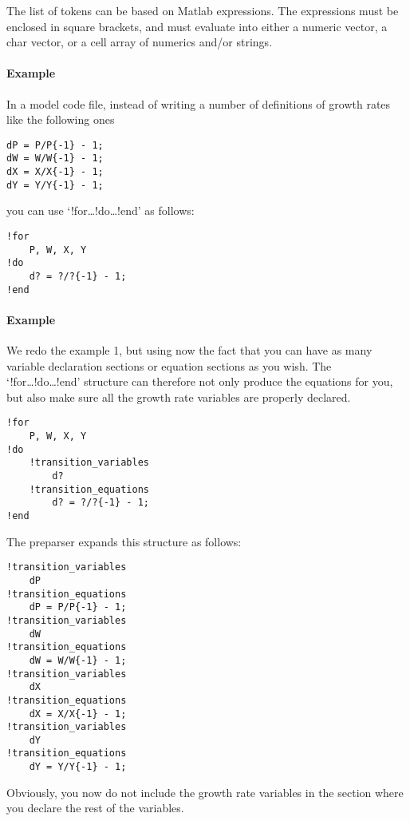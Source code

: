 The list of tokens can be based on Matlab expressions. The expressions
must be enclosed in square brackets, and must evaluate into either a
numeric vector, a char vector, or a cell array of numerics and/or
strings.

\paragraph{Example}

In a model code file, instead of writing a number of definitions of
growth rates like the following ones

\begin{verbatim}
dP = P/P{-1} - 1;
dW = W/W{-1} - 1;
dX = X/X{-1} - 1;
dY = Y/Y{-1} - 1;
\end{verbatim}

you can use `!for\ldots{}!do\ldots{}!end' as follows:

\begin{verbatim}
!for
    P, W, X, Y
!do
    d? = ?/?{-1} - 1;
!end
\end{verbatim}

\paragraph{Example}

We redo the example 1, but using now the fact that you can have as many
variable declaration sections or equation sections as you wish. The
`!for\ldots{}!do\ldots{}!end' structure can therefore not only produce
the equations for you, but also make sure all the growth rate variables
are properly declared.

\begin{verbatim}
!for
    P, W, X, Y
!do
    !transition_variables
        d?
    !transition_equations
        d? = ?/?{-1} - 1;
!end
\end{verbatim}

The preparser expands this structure as follows:

\begin{verbatim}
!transition_variables
    dP
!transition_equations
    dP = P/P{-1} - 1;
!transition_variables
    dW
!transition_equations
    dW = W/W{-1} - 1;
!transition_variables
    dX
!transition_equations
    dX = X/X{-1} - 1;
!transition_variables
    dY
!transition_equations
    dY = Y/Y{-1} - 1;
\end{verbatim}

Obviously, you now do not include the growth rate variables in the
section where you declare the rest of the variables.


